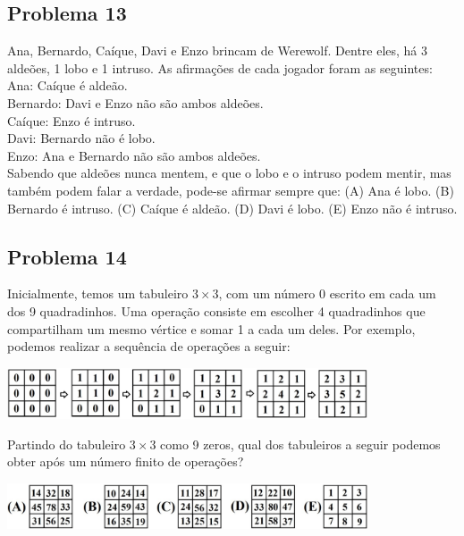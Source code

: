 \documentclass[12pt]{article}
\begin{document}
\subsection{Problema 13}
\begin{tcolorbox}[statementbox]
Ana, Bernardo, Caíque, Davi e Enzo brincam de Werewolf. Dentre eles, há 3 aldeões, 1 lobo e 1 intruso. As afirmações de cada jogador foram as seguintes: \\
Ana: Caíque é aldeão. \\
Bernardo: Davi e Enzo não são ambos aldeões. \\
Caíque: Enzo é intruso. \\
Davi: Bernardo não é lobo. \\
Enzo: Ana e Bernardo não são ambos aldeões. \\
Sabendo que aldeões nunca mentem, e que o lobo e o intruso podem mentir, mas também podem falar a verdade, pode-se afirmar sempre que:
(A) Ana é lobo. (B) Bernardo é intruso. (C) Caíque é aldeão. (D) Davi é lobo. (E) Enzo não é intruso.
\end{tcolorbox}
\clearpage

\subsection{Problema 14}
\begin{tcolorbox}[statementbox]
Inicialmente, temos um tabuleiro $3\times 3$, com um número $0$ escrito em cada um dos 9 quadradinhos. Uma operação consiste em escolher 4 quadradinhos que compartilham um mesmo vértice e somar 1 a cada um deles. Por exemplo, podemos realizar a sequência de operações a seguir:

      \begin{center}
    \includegraphics[width=0.8\textwidth]{fifth.png}
  \end{center}


Partindo do tabuleiro $3\times 3$ como 9 zeros, qual dos tabuleiros a seguir podemos obter após um número finito de operações?
    \begin{center}
    \includegraphics[width=0.8\textwidth]{sixth.png}
  \end{center}
\end{tcolorbox}
\clearpage
\end{document}

